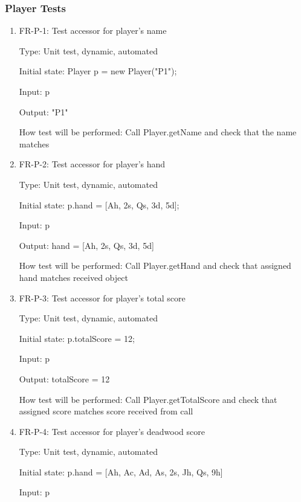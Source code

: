 \documentclass[12pt, titlepage]{article}
\begin{document}
\subsubsection{Player Tests}
\begin{enumerate}
    \item{FR-P-1: Test accessor for player's name\\}
    
    Type: Unit test, dynamic, automated
    					
    Initial state: Player p = new Player("P1");
    
    Input: p
    
    Output: "P1"
    
    How test will be performed: Call Player.getName and check that the name matches
    
    \item{FR-P-2: Test accessor for player's hand\\}
    
    Type: Unit test, dynamic, automated
    					
    Initial state: p.hand = [Ah, 2s, Qs, 3d, 5d];
    
    Input: p
    
    Output: hand = [Ah, 2s, Qs, 3d, 5d]
    
    How test will be performed: Call Player.getHand and check that assigned hand matches received object
    
    \item{FR-P-3: Test accessor for player's total score\\}
    
    Type: Unit test, dynamic, automated
    					
    Initial state: p.totalScore = 12;
    
    Input: p
    
    Output: totalScore = 12
    
    How test will be performed: Call Player.getTotalScore and check that assigned score matches score received from call
    
    \item{FR-P-4: Test accessor for player's deadwood score\\}
    
    Type: Unit test, dynamic, automated
    					
    Initial state: p.hand = [Ah, Ac, Ad, As, 2s, Jh, Qs, 9h]
    
    Input: p
    

\end{enumerate}
\end{document}
